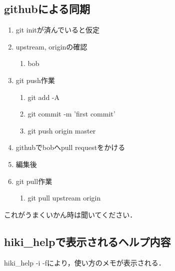 \subsection{githubによる同期}\begin{enumerate}
\item git initが済んでいると仮定
\item upstream, originの確認\begin{enumerate}
\item bob%
\end{enumerate}
\item git push作業\begin{enumerate}
\item git add -A
\item git commit -m 'first commit'
\item git push origin master
\end{enumerate}
\item githubでbobへpull requestをかける
\item 編集後
\item git pull作業\begin{enumerate}
\item git pull upstream origin
\end{enumerate}
\end{enumerate}
これがうまくいかん時は聞いてください．

\subsection{hiki\_helpで表示されるヘルプ内容}
hiki\_help -i -fにより，使い方のメモが表示される．

